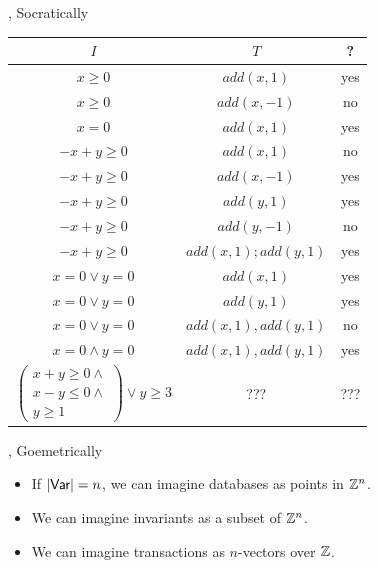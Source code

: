 \documentclass[xcolor={dvipsnames,svgnames,table}]{beamer}
\begin{document}
\newcommand{\inva}{x + y \geq 0}
\newcommand{\invb}{x - y \leq 0}
\newcommand{\invc}{y \geq 1}
\newcommand{\invd}{y \geq 3}
\newcommand{\inv}{(\inva \land \invb \land \invc) \lor (\invd)}

\begin{frame}{\iconfluence{}, Socratically}
  \begin{center}
    \begin{tabular}{c|c|c}
      $I$                 & $T$                    & \iconfluent{}? \\\hline\hline
      $x \geq 0$          & $add(x, 1)$            & \pause yes \pause \\\hline
      $x \geq 0$          & $add(x, -1)$           & \pause no  \pause \\\hline
      $x = 0$             & $add(x, 1)$            & \pause yes \pause \\\hline
      $-x + y \geq 0$     & $add(x, 1)$            & \pause no  \pause \\\hline
      $-x + y \geq 0$     & $add(x, -1)$           & \pause yes \pause \\\hline
      $-x + y \geq 0$     & $add(y, 1)$            & \pause yes \pause \\\hline
      $-x + y \geq 0$     & $add(y, -1)$           & \pause no  \pause \\\hline
      $-x + y \geq 0$     & $add(x, 1); add(y, 1)$ & \pause yes \pause \\\hline
      $x = 0 \lor y = 0$  & $add(x, 1)$            & \pause yes \pause \\\hline
      $x = 0 \lor y = 0$  & $add(y, 1)$            & \pause yes \pause \\\hline
      $x = 0 \lor y = 0$  & $add(x, 1), add(y, 1)$ & \pause no  \pause \\\hline
      $x = 0 \land y = 0$ & $add(x, 1), add(y, 1)$ & \pause yes \pause \\\hline
      $\begin{pmatrix}
        \inva \land {} \\
        \invb \land {} \\
        \invc
       \end{pmatrix} \lor \invd$ & ???  & ??? \\
    \end{tabular}
  \end{center}
\end{frame}

\begin{frame}{\iconfluence{}, Goemetrically}
  \begin{itemize}
    \item
      If $|\textsf{Var}| = n$, we can imagine databases as points in $\mathbb{Z}^n$.
    \item
      We can imagine invariants as a subset of $\mathbb{Z}^n$.
    \item
      We can imagine transactions as $n$-vectors over $\mathbb{Z}$.
  \end{itemize}
\end{frame}
\end{document}
